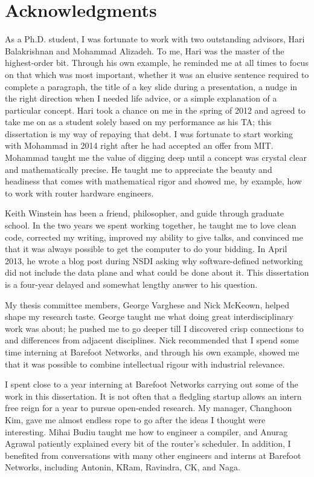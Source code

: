 \chapter*{Acknowledgments}
%

As a Ph.D. student, I was fortunate to work with two outstanding advisors, Hari
Balakrishnan and Mohammad Alizadeh. To me, Hari was the master of the
highest-order bit. Through his own example, he reminded me at all times to
focus on that which was most important, whether it was an elusive sentence
required to complete a paragraph, the title of a key slide during a
presentation, a nudge in the right direction when I needed life advice, or a
simple explanation of a particular concept. Hari took a chance on me in the
spring of 2012 and agreed to take me on as a student solely based on my
performance as his TA; this dissertation is my way of repaying that debt. I was
fortunate to start working with Mohammad in 2014 right after he had accepted an
offer from MIT. Mohammad taught me the value of digging deep until a concept
was crystal clear and mathematically precise. He taught me to appreciate the
beauty and headiness that comes with mathematical rigor and showed me, by
example, how to work with router hardware engineers.

Keith Winstein has been a friend, philosopher, and guide through graduate
school.  In the two years we spent working together, he taught me to love clean
code, corrected my writing, improved my ability to give talks, and convinced me
that it was always possible to get the computer to do your bidding. In April
2013, he wrote a blog post during NSDI asking why software-defined networking
did not include the data plane and what could be done about it. This
dissertation is a four-year delayed and somewhat lengthy answer to his
question.

My thesis committee members, George Varghese and Nick McKeown, helped shape my
research taste. George taught me what doing great interdisciplinary work was
about; he pushed me to go deeper till I discovered crisp connections to and
differences from adjacent disciplines. Nick recommended that I spend some time
interning at Barefoot Networks, and through his own example, showed me that it
was possible to combine intellectual rigour with industrial relevance.

I spent close to a year interning at Barefoot Networks carrying out some of the
work in this dissertation. It is not often that a fledgling startup allows an
intern free reign for a year to pursue open-ended research. My manager,
Changhoon Kim, gave me almost endless rope to go after the ideas I thought were
interesting. Mihai Budiu taught me how to engineer a compiler, and Anurag
Agrawal patiently explained every bit of the router's scheduler. In addition, I
benefited from conversations with many other engineers and interns at Barefoot
Networks, including Antonin, KRam, Ravindra, CK, and Naga.

